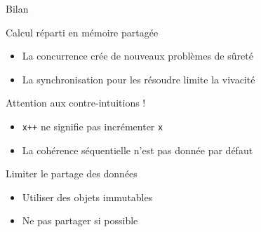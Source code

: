 
\begingroup

\begin{frame}[fragile]{Bilan}

  \vfill
  \begin{block}{Calcul réparti en mémoire partagée}
    \begin{itemize}
    \item La concurrence crée de nouveaux problèmes de sûreté
    \item La synchronisation pour les résoudre limite la vivacité
    \end{itemize}
  \end{block}
  \vfill
  \begin{block}{Attention aux contre-intuitions !}
    \begin{itemize}
    \item \lstinline{x++} \alert{ne signifie pas} \og incrémenter \lstinline{x} \fg
    \item La cohérence séquentielle n'est pas donnée par défaut
    \end{itemize}
  \end{block}
  \vfill
  \begin{alertblock}{Limiter le partage des données}
    \begin{itemize}
    \item Utiliser des objets immutables
    \item Ne pas partager si possible
    \end{itemize}
  \end{alertblock}
  \vfill
\end{frame}

\endgroup
\endinput
